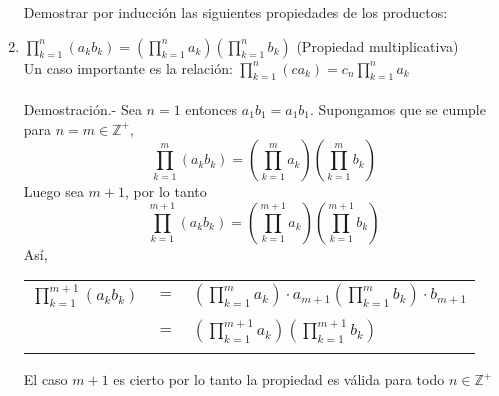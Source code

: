 \begin{enumerate}
Demostrar por inducción las siguientes propiedades de los productos:
\item $\displaystyle \prod_{k=1}^n (a_k b_k) = \left( \prod_{k=1}^n a_k \right) \left( \prod_{k=1}^n b_k \right)$ (Propiedad multiplicativa)\\
Un caso importante es la relación: $\displaystyle\prod_{k=1}^n (ca_k) = c_n \prod_{k=1}^n a_k$\\\\
Demostración.- \; Sea $n=1$ entonces $a_1 b_1 = a_1 b_1$. Supongamos que se cumple para $n = m \in \mathbb{Z}^+$, $$\prod\limits_{k=1}^m (a_k b_k) = \left( \prod\limits_{k=1}^m a_k \right) \left( \prod\limits_{k=1}^m b_k \right)$$
Luego sea $m+1$, por lo tanto $$\prod\limits_{k=1}^{m+1} (a_k b_k) = \left( \prod\limits_{k=1}^{m+1} a_k \right) \left( \prod\limits_{k=1}^{m+1} b_k \right)$$
Así, \\
\begin{center}
\begin{tabular}{r c l}
$\prod\limits_{k=1}^{m+1} (a_k b_k)$&$=$&$\left( \prod\limits_{k=1}^m a_k \right) \cdot a_{m+1} \left( \prod\limits_{k=1}^m b_k \right) \cdot b_{m+1}$\\\\
&$=$&$\left( \prod\limits_{k=1}^{m+1} a_k \right) \left( \prod\limits_{k=1}^{m+1} b_k \right)$\\\\
\end{tabular}
\end{center}
El caso $m+1$ es cierto por lo tanto la propiedad es válida para todo $n\in \mathbb{Z}^+$\\\\


\end{enumerate}
